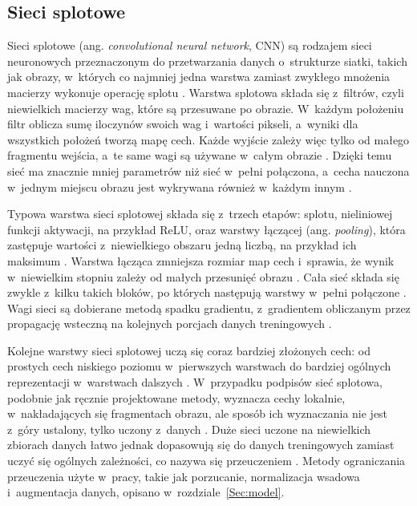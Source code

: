 \documentclass[12pt, twoside, openright]{article}
\begin{document}
\subsection{Sieci splotowe}
\label{Subsec:cnn}

Sieci splotowe (ang. \textit{convolutional neural network}, CNN) są rodzajem sieci neuronowych przeznaczonym do przetwarzania danych o~strukturze siatki, takich jak obrazy, w~których co najmniej jedna warstwa zamiast zwykłego mnożenia macierzy wykonuje operację splotu \cite{goodfellow2016}.
Warstwa splotowa składa się z~filtrów, czyli niewielkich macierzy wag, które są przesuwane po obrazie.
W~każdym położeniu filtr oblicza sumę iloczynów swoich wag i~wartości pikseli, a~wyniki dla wszystkich położeń tworzą mapę cech.
Każde wyjście zależy więc tylko od małego fragmentu wejścia, a~te same wagi są używane w~całym obrazie \cite{goodfellow2016,hafemann2017features}.
Dzięki temu sieć ma znacznie mniej parametrów niż sieć w~pełni połączona, a~cecha nauczona w~jednym miejscu obrazu jest wykrywana również w~każdym innym \cite{goodfellow2016}.

Typowa warstwa sieci splotowej składa się z~trzech etapów: splotu, nieliniowej funkcji aktywacji, na przykład ReLU, oraz warstwy łączącej (ang. \textit{pooling}), która zastępuje wartości z~niewielkiego obszaru jedną liczbą, na przykład ich maksimum \cite{goodfellow2016}.
Warstwa łącząca zmniejsza rozmiar map cech \cite{dey2017} i~sprawia, że wynik w~niewielkim stopniu zależy od małych przesunięć obrazu \cite{goodfellow2016}.
Cała sieć składa się zwykle z~kilku takich bloków, po których następują warstwy w~pełni połączone \cite{dey2017}.
Wagi sieci są dobierane metodą spadku gradientu, z~gradientem obliczanym przez propagację wsteczną na kolejnych porcjach danych treningowych \cite{dey2017}.

Kolejne warstwy sieci splotowej uczą się coraz bardziej złożonych cech: od prostych cech niskiego poziomu w~pierwszych warstwach do bardziej ogólnych reprezentacji w~warstwach dalszych \cite{hadsell2006}.
W~przypadku podpisów sieć splotowa, podobnie jak ręcznie projektowane metody, wyznacza cechy lokalnie, w~nakładających się fragmentach obrazu, ale sposób ich wyznaczania nie jest z~góry ustalony, tylko uczony z~danych \cite{hafemann2017features}.
Duże sieci uczone na niewielkich zbiorach danych łatwo jednak dopasowują się do danych treningowych zamiast uczyć się ogólnych zależności, co nazywa się przeuczeniem \cite{shorten2019}.
Metody ograniczania przeuczenia użyte w~pracy, takie jak porzucanie, normalizacja wsadowa i~augmentacja danych, opisano w~rozdziale~\ref{Sec:model}.
\end{document}
